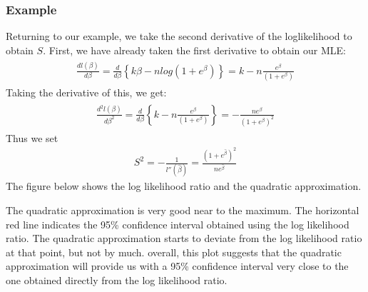 \documentclass[letterpaper,10pt,english]{jupyterBook}
\begin{document}
\subsubsection{Example}
\label{\detokenize{15.m. Logistic Regression:example}}
\sphinxAtStartPar
Returning to our example, we take the second derivative of the log\sphinxhyphen{}likelihood to obtain \(S\). First, we have already taken the first derivative to obtain our MLE:
\begin{equation*}
\begin{split}
\begin{align*}
\frac{d l(\beta)}{d \beta} = \frac{d}{d \beta} \left\{ k \beta   - n log \left(1 + e^{\beta} \right)  \right\} = k - n \frac{e^{\beta}}{\left(1 + e^{\beta} \right)}
\end{align*}
\end{split}
\end{equation*}
\sphinxAtStartPar
Taking the derivative of this, we get:
\begin{equation*}
\begin{split}
\begin{align*}
\frac{d^2 l(\beta)}{d \beta^2} = \frac{d}{d \beta} \left\{ k - n \frac{e^{\beta}}{\left(1 + e^{\beta} \right)} \right\} = -\frac{n e^\beta}{\left(1 + e^{\beta} \right)^2}
\end{align*}
\end{split}
\end{equation*}
\sphinxAtStartPar
Thus we set
\begin{equation*}
\begin{split}
S^2 = -\frac{1}{l''(\hat{\beta})} =  \frac{\left(1 + e^{\hat{\beta}} \right)^2}{n e^\hat{\beta}}
\end{split}
\end{equation*}
\sphinxAtStartPar
The figure below shows the log likelihood ratio and the quadratic approximation.

\noindent{}

\sphinxAtStartPar
The quadratic approximation is very good near to the maximum. The horizontal red line indicates the 95\% confidence interval obtained using the log likelihood ratio. The quadratic approximation starts to deviate from the log likelihood ratio at that point, but not by much. overall, this plot suggests that the quadratic approximation will provide us with a 95\% confidence interval very close to the one obtained directly from the log likelihood ratio.
\end{document}
